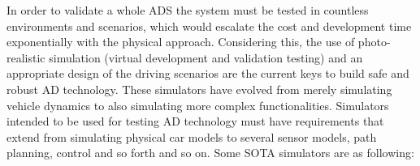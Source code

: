 
In order to validate a whole \ac{ADS} the system must be tested in countless environments and scenarios, which would escalate the cost and development time exponentially with the physical approach. Considering this, the use of photo-realistic simulation (virtual development and validation testing) and an appropriate design of the driving scenarios are the current keys to build safe and robust \ac{AD} technology. These simulators have evolved from merely simulating vehicle dynamics to also simulating more complex functionalities. Simulators intended to be used for testing \ac{AD} technology must have requirements that extend from simulating physical car models to several sensor models, path planning, control and so forth and so on. Some \ac{SOTA} simulators \cite{kaur2021survey} are as following:

